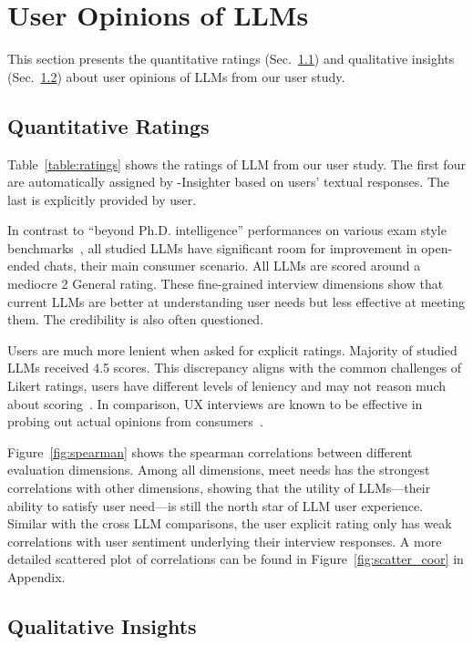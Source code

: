 

\section{User Opinions of LLMs}
This section presents the quantitative ratings (Sec.~\ref{sec.quantitative_rating})  and qualitative insights (Sec.~\ref{sec.qualitative_insight}) about user opinions of LLMs from our user study.

\subsection{Quantitative Ratings}
\label{sec.quantitative_rating}

Table~\ref{table:ratings} shows the ratings of LLM from our user study. The first four are automatically assigned by \method-Insighter based on users' textual responses. The last is explicitly provided by user. 

In contrast to ``beyond Ph.D. intelligence'' performances on various exam style benchmarks~\cite{phan2025humanitysexam}, all studied LLMs have significant room for improvement in open-ended chats, their main consumer scenario. All LLMs are scored around a mediocre 2 General rating. 
These fine-grained interview dimensions show that current LLMs are better at understanding user needs but less effective at meeting them. The credibility is also often questioned. 

Users are much more lenient when asked for explicit ratings. Majority of studied LLMs received 4.5 scores. 
This discrepancy aligns with the common challenges of Likert ratings, users have different levels of leniency and may not reason much about scoring~\cite{subedi2016using}. In comparison, UX interviews are known to be effective in probing out actual opinions from consumers~\cite{wilson2013interview}.

Figure~\ref{fig:spearman} shows the spearman correlations between different evaluation dimensions.  
Among all dimensions, meet needs has the strongest correlations with other dimensions, showing that the utility of LLMs---their ability to satisfy user need---is still the north star of LLM user experience. 
Similar with the cross LLM comparisons, the user explicit rating only has weak correlations with user sentiment underlying their interview responses.
 A more detailed scattered plot of correlations can be found in Figure~\ref{fig:scatter_coor} in Appendix. 

\subsection{Qualitative Insights}
\label{sec.qualitative_insight}

